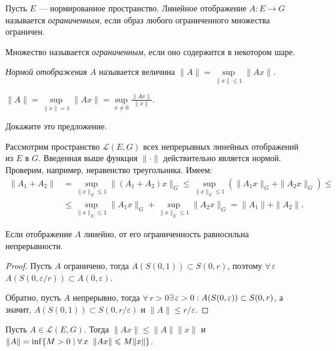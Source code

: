 \documentclass[12pt,titlepage, a4paper]{article}
\begin{document}
\lecture

\begin{defen}
Пусть $E$ --- нормированное пространство. Линейное отображение
$A\colon E\to G$ называется \emph{ограниченным}, если образ любого
ограниченного множества ограничен.

Множество называется \emph{ограниченным}, если оно содержится в
некотором шаре.

\emph{Нормой отображения $A$} называется величина
$\|A\|=\sup\limits_{\|x\|\leqslant 1}\|Ax\|$.
\end{defen}

\begin{predl}
$\|A\|=\sup\limits_{\|x\|=1}\|Ax\|=\sup\limits_{x\neq
0}\frac{\|Ax\|}{\|x\|}$.
\end{predl}

\begin{upr}
Докажите это предложение.
\end{upr}

Рассмотрим пространство $\mathcal{L}(E,G)$ всех непрерывных линейных
отображений из $E$ в $G$. Введенная выше функция $\|\cdot\|$
действительно является нормой. Проверим, например, неравенство
треугольника. Имеем:
\begin{align*}
\|A_1+A_2\|&=\sup\limits_{\|x\|_E\leqslant 1}\|(A_1+A_2)x\|_G
\leqslant \sup\limits_{\|x\|_E\leqslant
1}(\|A_1x\|_G+\|A_2x\|_G)\leqslant
\\&\leqslant\sup\limits_{\|x\|_E\leqslant
1}\|A_1x\|_G+\sup\limits_{\|x\|_E\leqslant
1}\|A_2x\|_G=\|A_1\|+\|A_2\|.
\end{align*}

\begin{predl}
Если отображение $A$ линейно, от его ограниченность равносильна
непрерывности.
\end{predl}

\begin{proof}
Пусть $A$ ограничено, тогда $A(S(0,1))\subset S(0,r)$, поэтому
$\forall\,\varepsilon$\;\;$A(S(0,\varepsilon/r))\subset
A(0,\varepsilon)$.

Обратно, пусть $A$ непрерывно, тогда
$\forall\,r>0$\;\;$\exists\,\varepsilon
>0:A(S(0,\varepsilon))\p\subset S(0,r)$, а значит, $A(S(0,1))\subset
S(0,r/\varepsilon)$ и $\|A\|\leqslant r/\varepsilon$.
\end{proof}

\begin{predl}
Пусть $A\in\mathcal{L}(E,G)$. Тогда $\|Ax\|\leqslant \|A\|\|x\|$ и
$\|A\|\p=\inf\{M>0\mid \forall\,x\;\;\|Ax\|\leqslant M\|x\|\}$.
\end{predl}
\end{document}
